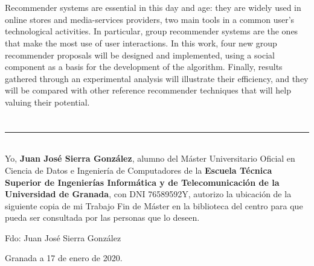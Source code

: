 \\

\vspace{0.7cm}
\\

Recommender systems are essential in this day and age: they are widely used in online stores and media-services providers, two main tools in a common user's technological activities. In particular, group recommender systems are the ones that make the most use of user interactions. In this work, four new group recommender proposals will be designed and implemented, using a social component as a basis for the development of the algorithm. Finally, results gathered through an experimental analysis will illustrate their efficiency, and they will be compared with other reference recommender techniques that will help valuing their potential.

\chapter*{}
\thispagestyle{empty}

\noindent\rule[-1ex]{\textwidth}{2pt}\\[4.5ex]

Yo, \textbf{Juan José Sierra González}, alumno del Máster Universitario Oficial en Ciencia de Datos e Ingeniería de Computadores de la \textbf{Escuela Técnica Superior de Ingenierías Informática y de Telecomunicación de la Universidad de Granada}, con DNI 76589592Y, autorizo la
ubicación de la siguiente copia de mi Trabajo Fin de Máster en la biblioteca del centro para que pueda ser
consultada por las personas que lo deseen.

\vspace{6cm}

\noindent Fdo: Juan José Sierra González

\vspace{2cm}

\begin{flushright}
Granada a 17 de enero de 2020.
\end{flushright}


\chapter*{}
\thispagestyle{empty}


